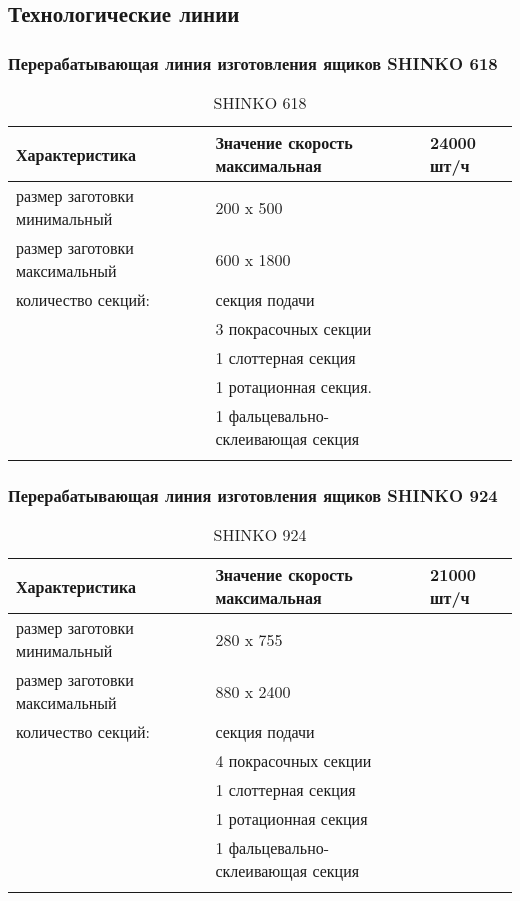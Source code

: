 \subsection{Технологические линии}

\subsubsection{Перерабатывающая линия изготовления ящиков SHINKO 618}
\begin{longtable}{|p{10cm}|p{5cm}|}
    \hline
	\textbf{Характеристика} & \textbf{Значение}
	\endhead
	\hline
скорость максимальная       	 & 24000 шт/ч\\
  	\hline 
размер заготовки минимальный  	& 200 x 500   \\	
  	\hline 
  	размер заготовки максимальный   & 600 x 1800  \\
  	\hline 
количество секций:    	& секция подачи\\
& 3 покрасочных секции \\
& 1 слоттерная секция\\
& 1 ротационная секция.\\
& 1 фальцевально-склеивающая секция \\
\hline 
  \caption{SHINKO 618}\label{tab:line1}
\end{longtable}


\subsubsection{Перерабатывающая линия изготовления ящиков SHINKO 924}
\begin{longtable}{|p{10cm}|p{5cm}|}
    \hline
	\textbf{Характеристика} & \textbf{Значение}
	\endhead
\hline
скорость максимальная       	 & 21000 шт/ч\\
  	\hline 
размер заготовки минимальный  	& 280 x 755  \\	
  	\hline 
  	размер заготовки максимальный   & 880 x 2400  \\
  	\hline 
количество секций:    	& секция подачи\\
& 4 покрасочных секции \\
& 1 слоттерная секция\\
& 1 ротационная секция\\
& 1 фальцевально-склеивающая секция\\
\hline 
  \caption{SHINKO 924}\label{tab:line2}
\end{longtable}



